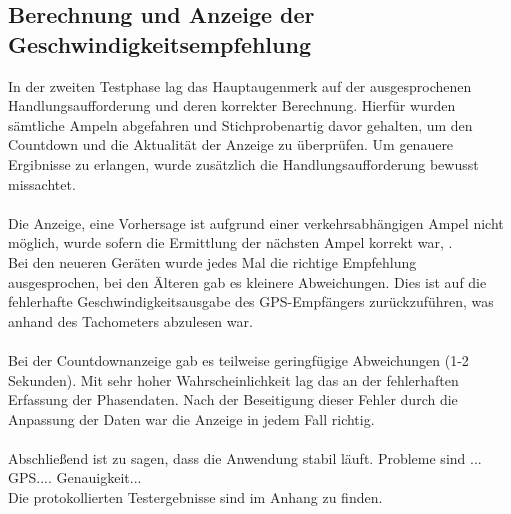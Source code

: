 \subsection{Berechnung und Anzeige der Geschwindigkeitsempfehlung}
In der zweiten Testphase lag das Hauptaugenmerk auf der ausgesprochenen Handlungsaufforderung und deren korrekter Berechnung. Hierfür wurden sämtliche Ampeln abgefahren und Stichprobenartig davor gehalten, um den Countdown und die Aktualität der Anzeige zu überprüfen. Um genauere Ergibnisse zu erlangen, wurde zusätzlich die Handlungsaufforderung bewusst missachtet.\\\\  
Die Anzeige, eine Vorhersage ist aufgrund einer verkehrsabhängigen Ampel nicht möglich, wurde sofern die Ermittlung der nächsten Ampel korrekt war, .\\ 
Bei den neueren Geräten wurde jedes Mal die richtige Empfehlung ausgesprochen, bei den Älteren gab es kleinere Abweichungen. Dies ist auf die fehlerhafte Geschwindigkeitsausgabe des \gls{GPS}-Empfängers zurückzuführen, was anhand des Tachometers abzulesen war. \\\\
Bei der Countdownanzeige gab es teilweise geringfügige Abweichungen (1-2 Sekunden). Mit sehr hoher Wahrscheinlichkeit lag das an der fehlerhaften Erfassung der Phasendaten. Nach der Beseitigung dieser Fehler durch die Anpassung der Daten war die Anzeige in jedem Fall richtig.\\\\

Abschließend ist zu sagen, dass die Anwendung stabil läuft. Probleme sind  ... GPS.... Genauigkeit...  \\
Die protokollierten Testergebnisse sind im Anhang zu finden.
